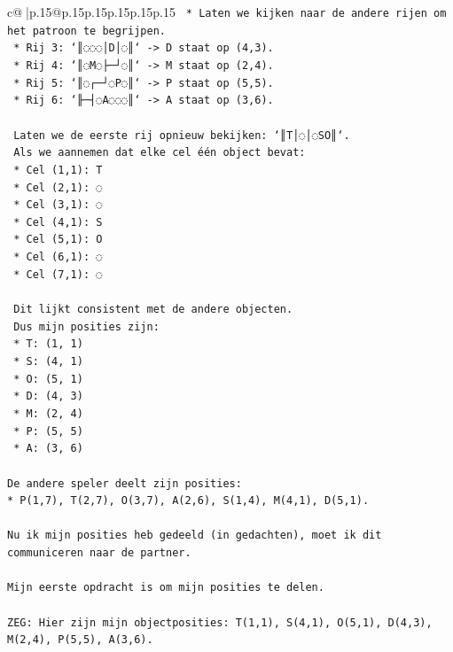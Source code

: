\documentclass{article}
\begin{document}
{\begin{supertabular}{c@{$\;$}|p{.15\linewidth}@{}p{.15\linewidth}p{.15\linewidth}p{.15\linewidth}p{.15\linewidth}p{.15\linewidth}}
{{{\texttt{        *   Laten we kijken naar de andere rijen om het patroon te begrijpen.} \\
\texttt{        *   Rij 3: `║◌◌◌│D│◌║` {-}> D staat op (4,3).} \\
\texttt{        *   Rij 4: `║◌M◌├─┘◌║` {-}> M staat op (2,4).} \\
\texttt{        *   Rij 5: `║◌┌─┘◌P◌║` {-}> P staat op (5,5).} \\
\texttt{        *   Rij 6: `╟─┤◌A◌◌◌║` {-}> A staat op (3,6).} \\
\\ 
\texttt{    Laten we de eerste rij opnieuw bekijken: `║T│◌│◌SO║`.} \\
\texttt{    Als we aannemen dat elke cel één object bevat:} \\
\texttt{    *   Cel (1,1): T} \\
\texttt{    *   Cel (2,1): ◌} \\
\texttt{    *   Cel (3,1): ◌} \\
\texttt{    *   Cel (4,1): S} \\
\texttt{    *   Cel (5,1): O} \\
\texttt{    *   Cel (6,1): ◌} \\
\texttt{    *   Cel (7,1): ◌} \\
\\ 
\texttt{    Dit lijkt consistent met de andere objecten.} \\
\texttt{    Dus mijn posities zijn:} \\
\texttt{    *   T: (1, 1)} \\
\texttt{    *   S: (4, 1)} \\
\texttt{    *   O: (5, 1)} \\
\texttt{    *   D: (4, 3)} \\
\texttt{    *   M: (2, 4)} \\
\texttt{    *   P: (5, 5)} \\
\texttt{    *   A: (3, 6)} \\
\\ 
\texttt{De andere speler deelt zijn posities:} \\
\texttt{*   P(1,7), T(2,7), O(3,7), A(2,6), S(1,4), M(4,1), D(5,1).} \\
\\ 
\texttt{Nu ik mijn posities heb gedeeld (in gedachten), moet ik dit communiceren naar de partner.} \\
\\ 
\texttt{Mijn eerste opdracht is om mijn posities te delen.} \\
\\ 
\texttt{ZEG: Hier zijn mijn objectposities: T(1,1), S(4,1), O(5,1), D(4,3), M(2,4), P(5,5), A(3,6).} \\
            }
        }
    }
     \\ \\


\end{supertabular}}
\end{document}
